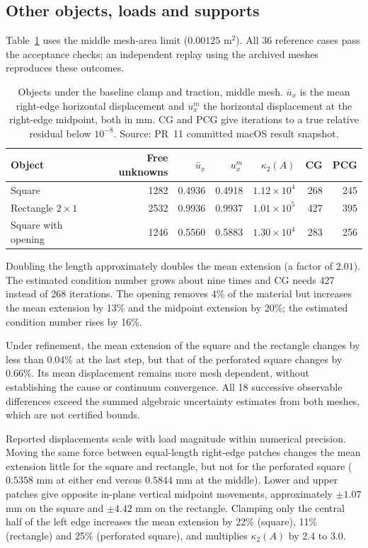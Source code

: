 \subsection{Other objects, loads and supports}
Table~\ref{tab:results-objects} uses the middle mesh-area limit
($0.00125$ m$^2$). All 36 reference cases pass the acceptance checks;
an independent replay using the archived meshes reproduces these outcomes.

\begin{table}[htbp]
 \centering
 \caption{Objects under the baseline clamp and traction, middle mesh.
 $\bar u_x$ is the mean right-edge horizontal displacement and $u_x^m$
 the horizontal displacement at the right-edge midpoint, both in mm.
 CG and PCG give iterations to a true relative residual below $10^{-8}$.
 Source: PR~11 committed macOS result snapshot.}
 \label{tab:results-objects}
 \begin{tabular}{lrrrrrr}
 \toprule
 Object & Free unknowns & $\bar u_x$ & $u_x^m$ & $\kappa_2(A)$ & CG & PCG\\
 \midrule
 Square & 1282 & 0.4936 & 0.4918 & $1.12\times10^{4}$ & 268 & 245\\
 Rectangle $2\times1$ & 2532 & 0.9936 & 0.9937 & $1.01\times10^{5}$ & 427 & 395\\
 Square with opening & 1246 & 0.5560 & 0.5883 & $1.30\times10^{4}$ & 283 & 256\\
 \bottomrule
 \end{tabular}
\end{table}

Doubling the length approximately doubles the mean extension (a factor
of $2.01$). The estimated condition number
grows about nine times and CG needs 427 instead of 268 iterations.
The opening removes 4\% of the material but increases the mean extension
by 13\% and the midpoint extension by 20\%; the estimated condition
number rises by 16\%.

Under refinement, the mean extension of the square and the rectangle
changes by less than 0.04\% at the last step, but that of the perforated
square changes by 0.66\%. Its mean displacement remains more mesh dependent,
without establishing the cause or continuum convergence.
All 18 successive observable differences
exceed the summed algebraic uncertainty estimates from both meshes,
which are not certified bounds.

Reported displacements scale with load magnitude within numerical
precision. Moving the same force between equal-length right-edge patches
changes the mean extension little for the square and rectangle, but not
for the perforated square ($0.5358$ mm at either end versus $0.5844$ mm
at the middle). Lower and upper patches give opposite in-plane vertical
midpoint movements, approximately $\pm1.07$ mm on the square and
$\pm4.42$ mm on the rectangle.
Clamping only the central half of the left edge increases the
mean extension by 22\% (square), 11\% (rectangle) and 25\% (perforated
square), and multiplies $\kappa_2(A)$ by 2.4 to 3.0.

